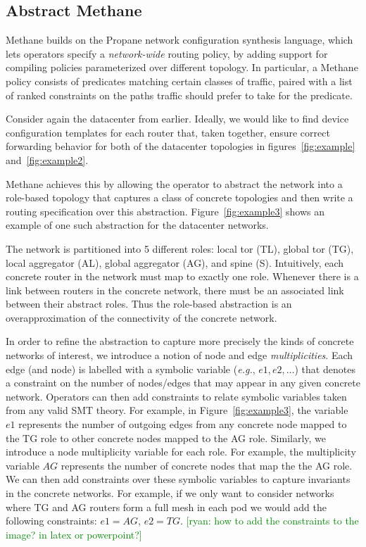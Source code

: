 \documentclass{sig-alternate-10pt}
\newcommand{\ryan}[1]{\textcolor{green}{[ryan: #1]}}
\newcommand{\EG}{\emph{e.g.}}
\newcommand{\sysname}{{\small \sf Methane}\xspace}
\begin{document}
\subsection{Abstract Methane}

\sysname builds on the Propane network configuration synthesis language,
which lets operators specify a \emph{network-wide} routing policy, by adding
support for compiling policies parameterized over different topology.
In particular, a \sysname policy consists of predicates matching
certain classes of traffic, paired with a list of ranked constraints
on the paths traffic should prefer to take for the predicate.

Consider again the datacenter from earlier. Ideally, we would like
to find device configuration templates for each router that, taken together, ensure correct forwarding
behavior for both of the datacenter topologies in figures~\ref{fig:example} and~\ref{fig:example2}.

\sysname achieves this by allowing the operator to abstract the network into
a role-based topology that captures a class of concrete topologies and then write a
routing specification over this abstraction. Figure~\ref{fig:example3} shows an example of one
such abstraction for the datacenter networks.

The network is partitioned into 5 different roles:
local tor (TL), global tor (TG), local aggregator (AL), global aggregator (AG), and spine (S).
Intuitively, each concrete router in the network must map to exactly one role.
Whenever there is a link between routers in the concrete network, there must be an associated link
between their abstract roles. Thus the role-based abstraction is an overapproximation of the connectivity
of the concrete network.

In order to refine the abstraction to capture more precisely the kinds of concrete networks of interest,
we introduce a notion of node and edge \emph{multiplicities}. Each edge (and node) is labelled
with a symbolic variable (\EG, $e1, e2, \ldots$) that denotes a constraint on the number of nodes/edges
that may appear in any given concrete network. Operators can then add constraints to relate symbolic
variables taken from any valid SMT theory. For example, in Figure~\ref{fig:example3}, the variable $e1$
represents the number of outgoing edges from any concrete node mapped to the TG role to other concrete
nodes mapped to the AG role. Similarly, we introduce a node multiplicity variable for each role. For example,
the multiplicity variable $AG$ represents the number of concrete nodes that map the the AG role. We can then
add constraints over these symbolic variables to capture invariants in the concrete networks. For example,
if we only want to consider networks where TG and AG routers form a full mesh in each pod we would add the
following constraints: $e1 = AG$, $e2 = TG$. \ryan{how to add the constraints to the image? in latex or powerpoint?}
\end{document}

